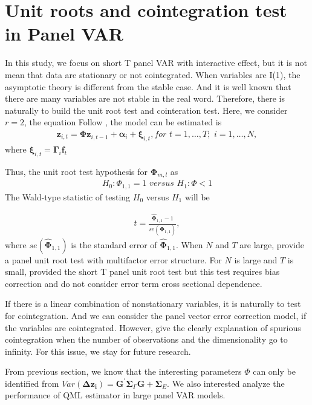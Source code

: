 \documentclass[12pt,a4paper,hyperref]{article}
\begin{document}
\section{Unit roots and cointegration test in Panel VAR}
In this study, we focus on short T panel VAR with interactive effect, but it is not mean that data are stationary or not cointegrated. When variables are I(1), the asymptotic theory is different from the stable case. And it is well known that there are many variables are not stable in the real word.
 Therefore, there is naturally to build the unit root test and cointeration test.
Here, we consider $r=2$,  the equation
 Follow  \citet{Binder:2005}, the model can be estimated is
\begin{align}
\boldsymbol{z}_{i,t}=\boldsymbol{\Phi z}_{i,t-1}+\boldsymbol{\alpha}_{i}+\boldsymbol{\xi}_{i,t},  for \,\, t=1,\ldots, T;\,\,i=1,\ldots,N,
\end{align}
where $\boldsymbol{\xi}_{i,t}=\boldsymbol{\Gamma}_{i}\boldsymbol{f}_{t}$

Thus, the unit root test hypothesis
 for $\boldsymbol{\Phi}_{m,l}$ as
 \begin{align}
H_{0}:\Phi_{1,1}=1\,\, versus\,\,H_{1}:\Phi<1
\end{align}
The Wald-type statistic of testing $H_{0}$ versus $H_{1}$ will be

\begin{align}
t=\frac{\hat{\boldsymbol{\Phi}}_{1,1}-1}{se(\hat{\boldsymbol{\Phi}}_{1,1})},
\end{align}
where $se(\hat{\boldsymbol{\Phi}}_{1,1})$ is the standard error of $\hat{\boldsymbol{\Phi}}_{1,1}$.
When $N$ and $T$ are large, \citet{Pesaran:2013} provide a panel unit root test with multifactor error structure.
For $N$ is large and $T$ is small, \citet{Harris:1999} provided the short T panel unit root test but this test requires bias correction and do not consider error term cross sectional dependence.

If there is a linear combination of nonstationary variables, it is naturally to test for cointegration. And we can consider the panel vector error correction model, if the variables are cointegrated.
However, \citet{Onatski:2018} give the clearly explanation of spurious cointegration when the number of observations and the dimensionality go to infinity.
For this issue, we stay for future research.


From previous section, we know that the interesting parameters $\Phi$ can only be identified from $Var(\boldsymbol{\Delta z_{i}})=\boldsymbol{ G}^{'}\boldsymbol{\Sigma}_{\Gamma}\boldsymbol{G}+\boldsymbol{\Sigma}_{E} $. We also interested analyze the performance of QML estimator in large panel VAR models.
\end{document}
